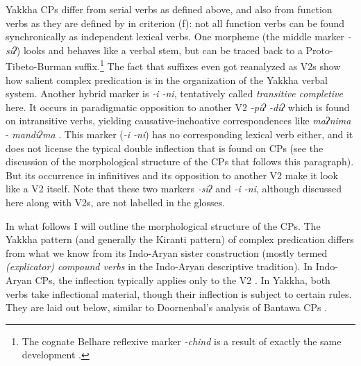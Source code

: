Yakkha CPs differ from  serial verbs as defined above, and also from function verbs as they are defined by \citet[362]{Schultze-Berndt2006_Taking} in criterion (f): not all function verbs can be found synchronically as independent lexical verbs. One morpheme (the middle marker \emph{-siʔ}) looks and behaves like a verbal stem, but can be traced back to a Proto-Tibeto-Burman suffix.\footnote{The cognate Belhare reflexive marker \emph{-chind} is a result of exactly  the same development \citep[560]{Bickel2003Belhare}.} The fact that suffixes even got reanalyzed as V2s show how salient complex predication is in the organization of the Yakkha verbal system. Another hybrid marker is \emph{-i \ti -ni}, tentatively called \emph{transitive completive} here. It occurs in paradigmatic opposition to another V2 \emph{-piʔ \ti -diʔ}  which is found on intransitive verbs, yielding causative-inchoative correspondences like \emph{maʔnima}  - \emph{mandiʔma} . This marker (\emph{-i \ti -ni}) has no corresponding lexical verb either, and it does not license the typical double inflection that is found on CPs (see the discussion of the morphological structure of the CPs that follows this paragraph). But its occurrence in infinitives and its opposition to another V2 make it look like a V2 itself. Note that these two markers \emph{-siʔ} and \emph{-i \ti -ni}, although discussed here along with V2s, are not labelled  in the glosses.

In what follows I will outline the morphological structure of the CPs. The Yakkha pattern (and generally the Kiranti pattern) of complex predication differs from what we know from its Indo-Aryan sister construction (mostly termed \emph{(explicator) compound verbs} in the Indo-Aryan descriptive tradition). In Indo-Aryan CPs, the inflection  typically applies only to the V2 \citep{Montaut2004Hindi, Butt1997_Complex, Hook1991_Emergence}. In Yakkha, both verbs take inflectional material, though their inflection is subject to certain rules. They are laid out below, similar to Doornenbal's analysis of Bantawa CPs \citep[251]{Doornenbal2009A-grammar}.

